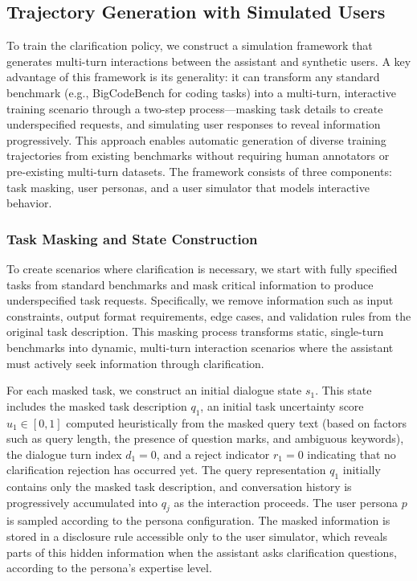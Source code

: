 \subsection{Trajectory Generation with Simulated Users}

To train the clarification policy, we construct a simulation framework that generates multi-turn interactions between the assistant and synthetic users. A key advantage of this framework is its generality: it can transform any standard benchmark (e.g., BigCodeBench for coding tasks) into a multi-turn, interactive training scenario through a two-step process—masking task details to create underspecified requests, and simulating user responses to reveal information progressively. This approach enables automatic generation of diverse training trajectories from existing benchmarks without requiring human annotators or pre-existing multi-turn datasets. The framework consists of three components: task masking, user personas, and a user simulator that models interactive behavior.

\subsubsection{Task Masking and State Construction}

To create scenarios where clarification is necessary, we start with fully specified tasks from standard benchmarks and mask critical information to produce underspecified task requests. Specifically, we remove information such as input constraints, output format requirements, edge cases, and validation rules from the original task description. This masking process transforms static, single-turn benchmarks into dynamic, multi-turn interaction scenarios where the assistant must actively seek information through clarification.

For each masked task, we construct an initial dialogue state $s_1$. 
This state includes the masked task description $q_1$, an initial task uncertainty score $u_1 \in [0,1]$ computed heuristically from the masked query text (based on factors such as query length, the presence of question marks, and ambiguous keywords), the dialogue turn index $d_1 = 0$, and a reject indicator $r_1 = 0$ indicating that no clarification rejection has occurred yet. 
The query representation $q_1$ initially contains only the masked task description, and conversation history is progressively accumulated into $q_j$ as the interaction proceeds. 
The user persona $p$ is sampled according to the persona configuration.
The masked information is stored in a disclosure rule accessible only to the user simulator, which reveals parts of this hidden information when the assistant asks clarification questions, according to the persona's expertise level.

